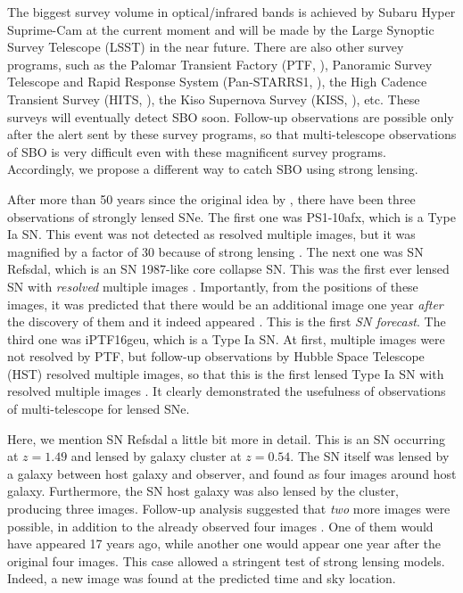 \documentclass[useAMS,usenatbib,twocolumn]{mnras}
\begin{document}
The biggest survey volume in optical/infrared bands is achieved by
Subaru Hyper Suprime-Cam \citep{miya12} at the current moment and will
be made by the Large Synoptic Survey Telescope (LSST) \citep{mars17}
in the near future. There are also other survey programs, such as the
Palomar Transient Factory (PTF, \citealt{law09}), Panoramic Survey
Telescope and Rapid Response System (Pan-STARRS1, \citealt{kais10}),
the High Cadence Transient Survey (HITS, \citealt{foer16}), the Kiso
Supernova Survey (KISS, \citealt{moro14}), etc. These surveys will
eventually detect SBO soon. Follow-up observations are possible only
after the alert sent by these survey programs, so that multi-telescope
observations of SBO is very difficult even with these magnificent
survey programs. Accordingly, we propose a different way to catch SBO
using strong lensing.

After more than 50 years since the original idea by \citet{refs64},
there have been three observations of strongly lensed SNe. The first
one was PS1-10afx, which is a Type Ia SN. This event was not detected
as resolved multiple images, but it was magnified by a factor of 30
because of strong lensing \citep{quim13,quim14}. The next one was SN
Refsdal, which is an SN 1987-like core collapse SN. This was the first
ever lensed SN with {\it resolved} multiple images
\citep{kell15}. Importantly, from the positions of these images, it
was predicted that there would be an additional image one year {\it
  after} the discovery of them and it indeed appeared
\citep{kell16}. This is the first {\it SN forecast}. The third one was
iPTF16geu, which is a Type Ia SN. At first, multiple images were not
resolved by PTF, but follow-up observations by Hubble Space Telescope
(HST) resolved multiple images, so that this is the first lensed Type
Ia SN with resolved multiple images \citep{goob17}. It clearly
demonstrated the usefulness of observations of multi-telescope for
lensed SNe.

Here, we mention SN Refsdal a little bit more in detail. This is an SN
occurring at $z=1.49$ and lensed by galaxy cluster at $z=0.54$. The SN
itself was lensed by a galaxy between host galaxy and observer, and
found as four images around host galaxy. Furthermore, the SN host
galaxy was also lensed by the cluster, producing three
images. Follow-up analysis suggested that {\it two} more images were
possible, in addition to the already observed four images
\citep[e.g.][]{ogur15,treu16}. One of them would have appeared 17
years ago, while another one would appear one year after the original
four images. This case allowed a stringent test of strong lensing
models. Indeed, a new image was found at the predicted time and sky
location.
\end{document}
